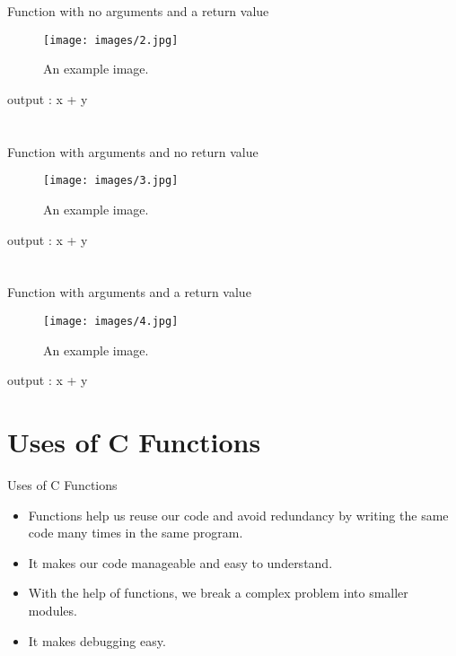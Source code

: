 \documentclass{beamer}
\begin{document}
\section{}
\begin{frame}{Function with no arguments and a return value}

\begin{figure}
\centering
    \texttt{[image: images/2.jpg]}
\caption{An example image.}
\end{figure}

output : x + y
    
\end{frame}


\section{}
\begin{frame}{Function with  arguments and no return value}

\begin{figure}
\centering
    \texttt{[image: images/3.jpg]}
\caption{An example image.}
\end{figure}

output : x + y
    
\end{frame}

\section{}
\begin{frame}{Function with  arguments and a return value}

\begin{figure}
\centering
    \texttt{[image: images/4.jpg]}
\caption{An example image.}
\end{figure}

output : x + y
    
\end{frame}

\section{Uses of C Functions}
\begin{frame}[fragile]{Uses of C Functions}
    \begin{itemize}
        \item Functions help us reuse our code and avoid redundancy by writing the same code many times in the same program.
			\item It makes our code manageable and easy to understand.
			\item With the help of functions, we break a complex problem into smaller modules.
			\item It makes debugging easy.
 
    \end{itemize}

   
\end{frame}
\end{document}
